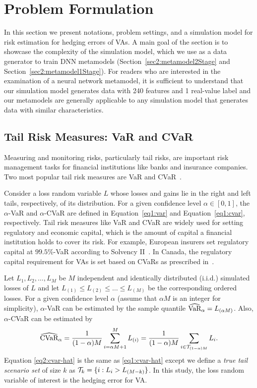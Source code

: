 \section{Problem Formulation} \label{sec2:problem-formulation}

In this section we present notations, problem settings, and a simulation model for risk estimation for hedging errors of VAs.
A main goal of the section is to showcase the complexity of the simulation model, which we use as a data generator to train DNN metamodels (Section~\ref{sec2:metamodel2Stage} and Section~\ref{sec2:metamodel1Stage}).
For readers who are interested in the examination of a neural network metamodel, it is sufficient to understand that our simulation model generates data with 240 features and 1 real-value label and our metamodels are generally applicable to any simulation model that generates data with similar characteristics.

\subsection{Tail Risk Measures: VaR and CVaR}
Measuring and monitoring risks, particularly tail risks, are important risk management tasks for financial institutions like banks and insurance companies.
Two most popular tail risk measures are VaR and CVaR~\citep{hardy2022quantitative, rockafellar2002conditional}. 

Consider a loss random variable $L$ whose losses and gains lie in the right and left tails, respectively, of its distribution.
For a given confidence level $\alpha\in [0,1]$, the $\alpha$-VaR and $\alpha$-CVaR are defined in Equation~\eqref{eq1:var} and Equation~\eqref{eq1:cvar}, respectively.
Tail risk measures like VaR and CVaR are widely used for setting regulatory and economic capital, which is the amount of capital a financial institution holds to cover its risk.
For example, European insurers set regulatory capital at $99.5\%$-VaR according to Solvency II~\cite{eiopa2014underlying}.
In Canada, the regulatory capital requirement for VAs is set based on CVaRs as prescribed in~\cite{osfi2017life}.

Let $L_1,L_2,\ldots,L_M$ be $M$ independent and identically distributed (i.i.d.) simulated losses of $L$ and let $L_{(1)}\leq L_{(2)}\leq \ldots\leq L_{(M)}$ be the corresponding ordered losses.
For a given confidence level $\alpha$ (assume that $\alpha M$ is an integer for simplicity), $\alpha$-VaR can be estimated by the sample quantile $\widehat{\mbox{VaR}}_\alpha = L_{(\alpha M)}$. Also, $\alpha$-CVaR can be estimated by
\begin{equation} \label{eq2:cvar-hat}
    \widehat{\mbox{CVaR}}_\alpha = \frac{1}{(1-\alpha)M} \sum_{i=\alpha M + 1}^{M}L_{(i)} = \frac{1}{(1-\alpha)M} \sum_{i \in \mathcal{T}_{(1-\alpha )M}}L_{i}.
\end{equation}
Equation \eqref{eq2:cvar-hat} is the same as \eqref{eq1:cvar-hat} except we define a \textit{true tail scenario set} of size $k$ as $\mathcal{T}_{k} = \{i: L_i > L_{(M-k)}\}$.
In this study, the loss random variable of interest is the hedging error for VA.

